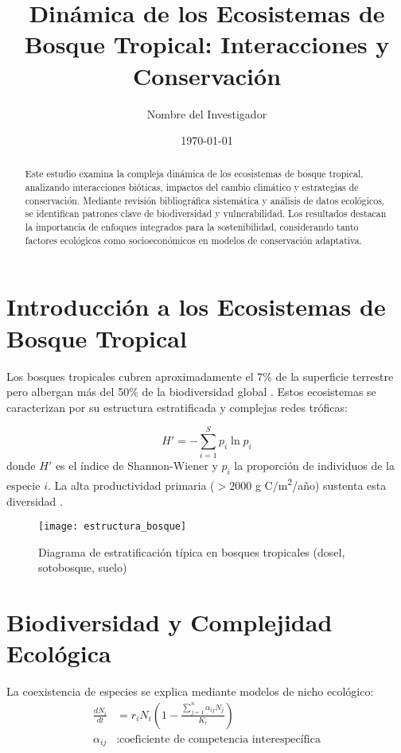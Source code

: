 \documentclass[12pt,a4paper]{article}
\title{Dinámica de los Ecosistemas de Bosque Tropical: Interacciones y Conservación}
\author{Nombre del Investigador}
\date{\today}
\begin{document}
\maketitle

\begin{abstract}
Este estudio examina la compleja dinámica de los ecosistemas de bosque tropical, analizando interacciones bióticas, impactos del cambio climático y estrategias de conservación. Mediante revisión bibliográfica sistemática y análisis de datos ecológicos, se identifican patrones clave de biodiversidad y vulnerabilidad. Los resultados destacan la importancia de enfoques integrados para la sostenibilidad, considerando tanto factores ecológicos como socioeconómicos en modelos de conservación adaptativa.
\end{abstract}

\section{Introducción a los Ecosistemas de Bosque Tropical}
Los bosques tropicales cubren aproximadamente el 7\% de la superficie terrestre pero albergan más del 50\% de la biodiversidad global \cite{gaston2000}. Estos ecosistemas se caracterizan por su estructura estratificada y complejas redes tróficas:

\begin{equation}
H' = -\sum_{i=1}^{S} p_i \ln p_i
\end{equation}
donde \(H'\) es el índice de Shannon-Wiener y \(p_i\) la proporción de individuos de la especie \(i\). La alta productividad primaria (\(>2000\) g C/m\textsuperscript{2}/año) sustenta esta diversidad \cite{malhi2011}.

\begin{figure}[H]
\centering
\texttt{[image: estructura\_bosque]}
\caption{Diagrama de estratificación típica en bosques tropicales (dosel, sotobosque, suelo)}
\label{fig:estratificacion}
\end{figure}

\section{Biodiversidad y Complejidad Ecológica}
La coexistencia de especies se explica mediante modelos de nicho ecológico:
\begin{align*}
\frac{dN_i}{dt} &= r_i N_i \left(1 - \frac{\sum_{j=1}^{n} \alpha_{ij} N_j}{K_i}\right) \\
\alpha_{ij} &: \text{coeficiente de competencia interespecífica}
\end{align*}
\end{document}

